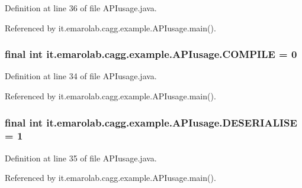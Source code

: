 Definition at line 36 of file A\-P\-Iusage.\-java.



Referenced by it.\-emarolab.\-cagg.\-example.\-A\-P\-Iusage.\-main().

\hypertarget{classit_1_1emarolab_1_1cagg_1_1example_1_1APIusage_a71d4b6e26297065605624b302b0ab173}{
\subsubsection[{C\-O\-M\-P\-I\-L\-E}]{\setlength{\rightskip}{0pt plus 5cm}final int it.\-emarolab.\-cagg.\-example.\-A\-P\-Iusage.\-C\-O\-M\-P\-I\-L\-E = 0\hspace{0.3cm}{\ttfamily [static]}}}\label{classit_1_1emarolab_1_1cagg_1_1example_1_1APIusage_a71d4b6e26297065605624b302b0ab173}


Definition at line 34 of file A\-P\-Iusage.\-java.



Referenced by it.\-emarolab.\-cagg.\-example.\-A\-P\-Iusage.\-main().

\hypertarget{classit_1_1emarolab_1_1cagg_1_1example_1_1APIusage_af308dfbdcb747bc10039350250e04163}{
\subsubsection[{D\-E\-S\-E\-R\-I\-A\-L\-I\-S\-E}]{\setlength{\rightskip}{0pt plus 5cm}final int it.\-emarolab.\-cagg.\-example.\-A\-P\-Iusage.\-D\-E\-S\-E\-R\-I\-A\-L\-I\-S\-E = 1\hspace{0.3cm}{\ttfamily [static]}}}\label{classit_1_1emarolab_1_1cagg_1_1example_1_1APIusage_af308dfbdcb747bc10039350250e04163}


Definition at line 35 of file A\-P\-Iusage.\-java.



Referenced by it.\-emarolab.\-cagg.\-example.\-A\-P\-Iusage.\-main().

